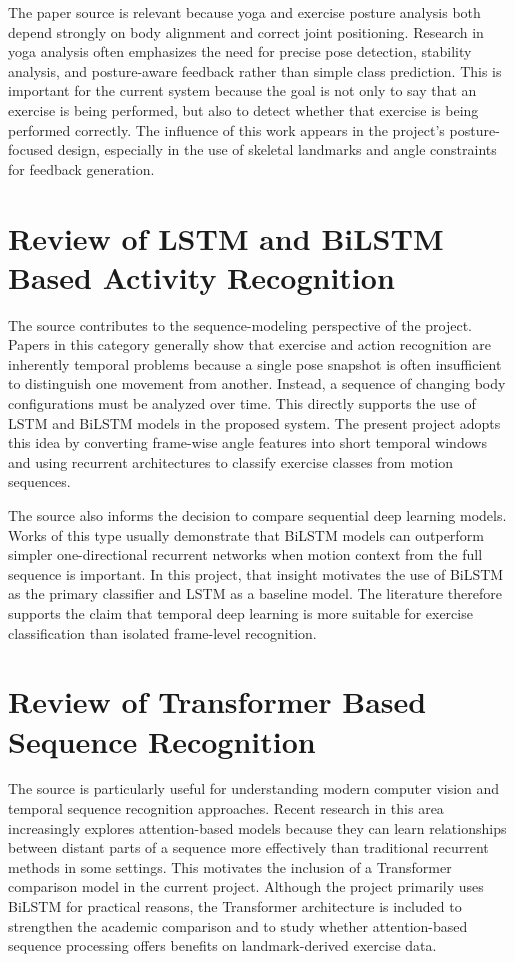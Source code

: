 \documentclass[12pt,a4paper]{report}
\begin{document}
The paper source \cite{yoga_arxiv} is relevant because yoga and exercise posture analysis both depend strongly on body alignment and correct joint positioning. Research in yoga analysis often emphasizes the need for precise pose detection, stability analysis, and posture-aware feedback rather than simple class prediction. This is important for the current system because the goal is not only to say that an exercise is being performed, but also to detect whether that exercise is being performed correctly. The influence of this work appears in the project's posture-focused design, especially in the use of skeletal landmarks and angle constraints for feedback generation.

\section{Review of LSTM and BiLSTM Based Activity Recognition}
The source \cite{paper_1374} contributes to the sequence-modeling perspective of the project. Papers in this category generally show that exercise and action recognition are inherently temporal problems because a single pose snapshot is often insufficient to distinguish one movement from another. Instead, a sequence of changing body configurations must be analyzed over time. This directly supports the use of LSTM and BiLSTM models in the proposed system. The present project adopts this idea by converting frame-wise angle features into short temporal windows and using recurrent architectures to classify exercise classes from motion sequences.

The source \cite{ijsret_1052} also informs the decision to compare sequential deep learning models. Works of this type usually demonstrate that BiLSTM models can outperform simpler one-directional recurrent networks when motion context from the full sequence is important. In this project, that insight motivates the use of BiLSTM as the primary classifier and LSTM as a baseline model. The literature therefore supports the claim that temporal deep learning is more suitable for exercise classification than isolated frame-level recognition.

\section{Review of Transformer Based Sequence Recognition}
The source \cite{visapp_2024_266} is particularly useful for understanding modern computer vision and temporal sequence recognition approaches. Recent research in this area increasingly explores attention-based models because they can learn relationships between distant parts of a sequence more effectively than traditional recurrent methods in some settings. This motivates the inclusion of a Transformer comparison model in the current project. Although the project primarily uses BiLSTM for practical reasons, the Transformer architecture is included to strengthen the academic comparison and to study whether attention-based sequence processing offers benefits on landmark-derived exercise data.
\end{document}
